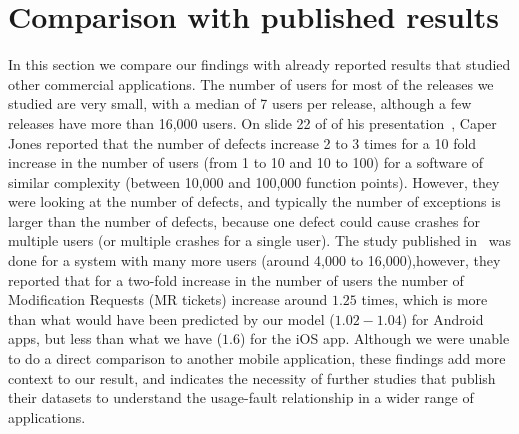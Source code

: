 \documentclass[smallextended]{svjour3}       %
\begin{document}
\section{Comparison with published results}\label{sec:compare}
In this section we compare our findings with already reported results that studied other commercial applications. 
The number of users for most of the releases we studied are very small, with a 
median of 7 users per release, although a few releases have more than 16,000 users.
On slide 22 of of his presentation~\cite{caper}, Caper Jones reported that the
number of defects increase 2 to 3 times for a 10 fold increase in the number of users
(from 1 to 10 and 10 to 100) for a software of similar complexity (between 10,000
and 100,000 function points). However, they were looking at the number of 
defects, and typically the number of 
exceptions is larger than the number of defects, because one defect could cause crashes for multiple users (or multiple crashes for a single user). The study published in~\cite{IQ08} was done for a system with many 
more users (around 4,000 to 16,000),however, they reported that for a two-fold increase in the 
number of users the number of Modification Requests (MR tickets) increase around $1.25$ times, 
which is more than what would have been predicted by our model ($1.02 - 1.04$) for Android apps, but less than what we have ($1.6$) for the iOS app. Although we
were unable to do a direct comparison to another mobile application, these findings add more context to our result, and indicates the necessity of further studies that publish their datasets to understand the usage-fault relationship in a wider range of applications.

\vspace{-10pt}
\end{document}
